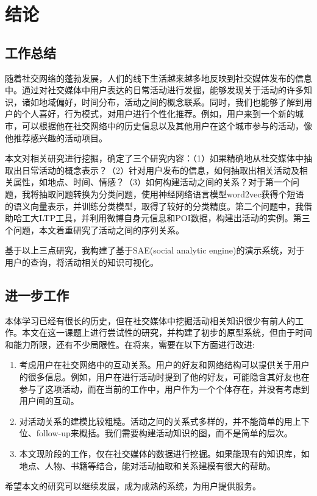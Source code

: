 \chapter{结论}

\section{工作总结}

随着社交网络的蓬勃发展，人们的线下生活越来越多地反映到社交媒体发布的信息中。通过对社交媒体中用户表达的日常活动进行发掘，能够发现关于活动的许多知识，诸如地域偏好，时间分布，活动之间的概念联系。同时，我们也能够了解到用户的个人喜好，行为模式，对用户进行个性化推荐。例如，用户来到一个新的城市，可以根据他在社交网络中的历史信息以及其他用户在这个城市参与的活动，像他推荐感兴趣的活动项目。

本文对相关研究进行挖掘，确定了三个研究内容：（1）如果精确地从社交媒体中抽取出日常活动的概念表示？（2）针对用户发布的信息，如何抽取出相关活动及相关属性，如地点、时间、情感？（3）如何构建活动之间的关系？对于第一个问题，我将抽取问题转换为分类问题，使用神经网络语言模型word2vec获得个短语的语义向量表示，并训练分类模型，取得了较好的分类精度。第二个问题中，我借助哈工大LTP工具，并利用微博自身元信息和POI数据，构建出活动的实例。第三个问题，本文着重研究了活动之间的序列关系。

基于以上三点研究，我构建了基于SAE(social analytic engine)的演示系统，对于用户的查询，将活动相关的知识可视化。

\section{进一步工作}

本体学习已经有很长的历史，但在社交媒体中挖掘活动相关知识很少有前人的工作。本文在这一课题上进行尝试性的研究，并构建了初步的原型系统，但由于时间和能力所限，还有不少局限性。在将来，需要在以下方面进行改进:
\begin{enumerate}
	\item 考虑用户在社交网络中的互动关系。用户的好友和网络结构可以提供关于用户的很多信息。例如，用户在进行活动时提到了他的好友，可能隐含其好友也在参与了这项活动，而在当前的工作中，用户作为一个个体存在，并没有考虑到用户间的互动。
	\item 对活动关系的建模比较粗糙。活动之间的关系式多样的，并不能简单的用上下位、follow-up来概括。我们需要构建活动知识的图，而不是简单的层次。
	\item 本文现阶段的工作，仅在社交媒体的数据进行挖掘。如果能现有的知识库，如地点、人物、书籍等结合，能对活动抽取和关系建模有很大的帮助。
\end{enumerate}

希望本文的研究可以继续发展，成为成熟的系统，为用户提供服务。